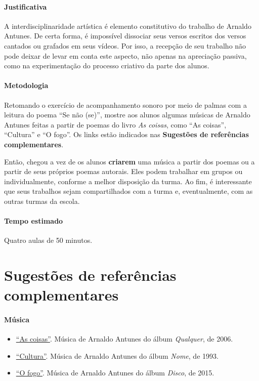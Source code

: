 \documentclass[11pt]{extarticle}
\begin{document}
\paragraph{Justificativa} A interdisciplinaridade artística é elemento
constitutivo do trabalho de Arnaldo Antunes. De certa forma, 
é impossível dissociar seus versos escritos dos versos cantados
ou grafados em seus vídeos. Por isso, a recepção de seu trabalho
não pode deixar de levar em conta este aspecto, não apenas
na apreciação passiva, como na experimentação do processo criativo
da parte dos alunos. 

\paragraph{Metodologia} Retomando o exercício de acompanhamento
sonoro por meio de palmas com a leitura do poema ``Se não (se)'',
mostre aos alunos algumas músicas de Arnaldo Antunes feitas a partir de
poemas do livro \textit{As coisas}, como ``As coisas'', ``Cultura'' e
``O fogo''. Os links estão indicados nas \textbf{Sugestões de referências complementares}.

Então, chegou a vez de os alunos \textbf{criarem} uma música a partir dos poemas 
ou a partir de seus próprios poemas autorais. 
Eles podem trabalhar em grupos ou individualmente,
conforme a melhor disposição da turma. 
Ao fim, é interessante que seus trabalhos sejam compartilhados
com a turma e, eventualmente, com as outras turmas da escola.

\paragraph{Tempo estimado} Quatro aulas de 50 minutos.


\section{Sugestões de referências complementares}

\paragraph{Música}

\begin{itemize}
\item \href{https://www.youtube.com/watch?v=JF4MruZSwzg}{``As coisas''}. Música de Arnaldo Antunes do álbum \textit{Qualquer}, de 2006. 

\item \href{https://www.youtube.com/watch?v=Aguu_QzCQy8}{``Cultura''}. Música de Arnaldo Antunes do álbum \textit{Nome}, de 1993. 

\item \href{https://www.youtube.com/watch?v=kUgUNHj2VlE}{``O fogo''}. Música de Arnaldo Antunes do álbum \textit{Disco}, de 2015. 
\end{itemize}
\end{document}
